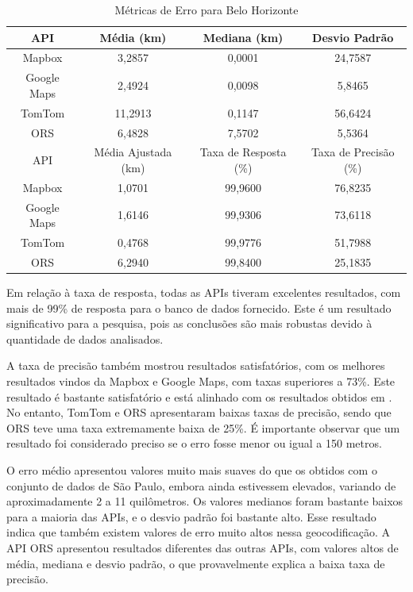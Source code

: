 \begin{table}[!ht]
\centering
\caption{Métricas de Erro para Belo Horizonte}
\label{tab:tabelaDeMetricasBH}
\begin{adjustbox}{width=0.7\textwidth}
\begin{tabular}{|c|c|c|c|}
\hline
API & Média (km) & Mediana (km) & Desvio Padrão \\
\hline
Mapbox & 3,2857 & 0,0001 & 24,7587 \\
Google Maps & 2,4924 & 0,0098 & 5,8465 \\
TomTom & 11,2913 & 0,1147 & 56,6424 \\
ORS & 6,4828 & 7,5702 & 5,5364 \\
\hline
\hline
API & Média Ajustada (km) & Taxa de Resposta (\%) & Taxa de Precisão (\%) \\
\hline
Mapbox & 1,0701 & 99,9600 & 76,8235 \\
Google Maps & 1,6146 & 99,9306 & 73,6118 \\
TomTom & 0,4768 & 99,9776 & 51,7988 \\
ORS & 6,2940 & 99,8400 & 25,1835 \\
\hline
\end{tabular}
\end{adjustbox}
\end{table}

Em relação à taxa de resposta, todas as APIs tiveram excelentes resultados, com mais de 99\% de resposta para o banco de dados fornecido. Este é um resultado significativo para a pesquisa, pois as conclusões são mais robustas devido à quantidade de dados analisados.

A taxa de precisão também mostrou resultados satisfatórios, com os melhores resultados vindos da Mapbox e Google Maps, com taxas superiores a 73\%. Este resultado é bastante satisfatório e está alinhado com os resultados obtidos em \cite{Clodoveu2011}. No entanto, TomTom e ORS apresentaram baixas taxas de precisão, sendo que ORS teve uma taxa extremamente baixa de 25\%. É importante observar que um resultado foi considerado preciso se o erro fosse menor ou igual a 150 metros.

O erro médio apresentou valores muito mais suaves do que os obtidos com o conjunto de dados de São Paulo, embora ainda estivessem elevados, variando de aproximadamente 2 a 11 quilômetros. Os valores medianos foram bastante baixos para a maioria das APIs, e o desvio padrão foi bastante alto. Esse resultado indica que também existem valores de erro muito altos nessa geocodificação. A API ORS apresentou resultados diferentes das outras APIs, com valores altos de média, mediana e desvio padrão, o que provavelmente explica a baixa taxa de precisão.


